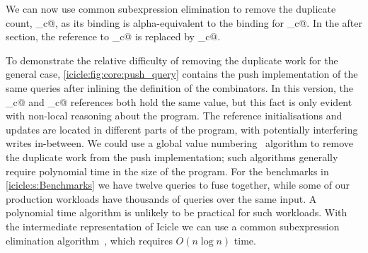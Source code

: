 We can now use common subexpression elimination to remove the duplicate count, \IcC@mean_c@, as its binding is alpha-equivalent to the binding for \IcC@more_c@.
In the after section, the reference to \IcC@mean_c@ is replaced by \IcC@more_c@.


To demonstrate the relative difficulty of removing the duplicate work for the general case, \cref{icicle:fig:core:push_query} contains the push implementation of the same queries after inlining the definition of the combinators.
In this version, the \IcC@more_c@ and \IcC@mean_c@ references both hold the same value, but this fact is only evident with non-local reasoning about the program.
The reference initialisations and updates are located in different parts of the program, with potentially interfering writes in-between.
We could use a global value numbering~\citep{gulwani2004polynomial} algorithm to remove the duplicate work from the push implementation; such algorithms generally require polynomial time in the size of the program.
For the benchmarks in \cref{icicle:s:Benchmarks} we have twelve queries to fuse together, while some of our production workloads have thousands of queries over the same input.
A polynomial time algorithm is unlikely to be practical for such workloads.
With the intermediate representation of Icicle we can use a common subexpression elimination algorithm~\cite{chitil1997common}, which requires $O(n \log n)$ time.

